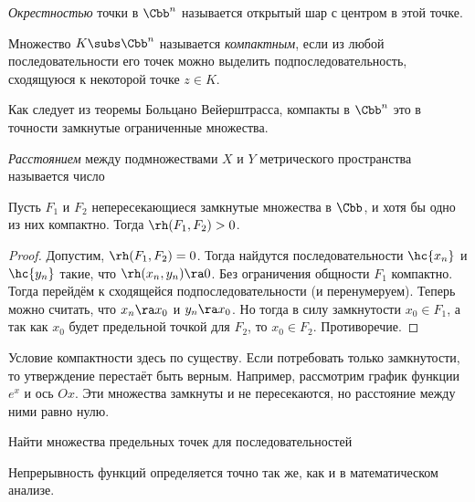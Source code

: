 \documentclass[a4paper]{article}
\begin{document}
\begin{df}
\emph{Окрестностью} точки в $\Cbb^n$ называется открытый шар с центром в этой точке.
\end{df}

\begin{df}
Множество $K\subs \Cbb^n$ называется \emph{компактным}, если из любой последовательности
его точек можно выделить подпоследовательность, сходящуюся к некоторой точке $z \in K$.
\end{df}

Как следует из теоремы Больцано Вейерштрасса, компакты в $\Cbb^n$ это в точности замкнутые ограниченные множества.

\begin{df}
\emph{Расстоянием} между подмножествами $X$ и $Y$ метрического пространства называется число
\end{df}

\begin{stm}
Пусть $F_1$ и $F_2$ непересекающиеся замкнутые множества в $\Cbb$, и хотя бы одно из них компактно.
Тогда $\rh(F_1, F_2) > 0$.
\end{stm}
\begin{proof}
Допустим, $\rh(F_1,F_2)=0$. Тогда найдутся последовательности $\hc{x_n}$ и $\hc{y_n}$ такие, что $\rh(x_n,y_n)\ra 0$.
Без ограничения общности $F_1$ компактно. Тогда перейдём к сходящейся подпоследовательности (и перенумеруем).
Теперь можно считать, что $x_n\ra x_0$ и $y_n\ra x_0$. Но тогда в силу замкнутости $x_0\in F_1$, а так как $x_0$ будет
предельной точкой для $F_2$, то $x_0\in F_2$. Противоречие.
\end{proof}

\begin{note}
Условие компактности здесь по существу. Если потребовать только замкнутости, то утверждение перестаёт быть верным.
Например, рассмотрим график функции $e^x$ и ось $Ox$. Эти множества замкнуты и не пересекаются, но расстояние
между ними равно нулю.
\end{note}

\begin{problem}
Найти множества предельных точек для последовательностей
\end{problem}

Непрерывность функций определяется точно так же, как и в математическом анализе.
\end{document}
